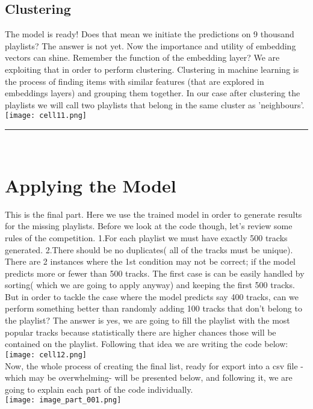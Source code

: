\documentclass[]{article}
\begin{document}
\begin{description}
\subsection{Clustering}
The model is ready! Does that mean we initiate the predictions on 9 thousand playlists? The answer is not yet. Now the importance and utility of embedding vectors can shine. Remember the function of the embedding layer? We are exploiting that in order to perform clustering. Clustering in machine learning is the process of finding items with similar features (that are explored in embeddings layers) and grouping them together. In our case after clustering the playlists we will call two playlists that belong in the same cluster as 'neighbours'. 
\\
\texttt{[image: cell11.png]}
\noindent
{\color{blue} \rule{\linewidth}{0.4mm}}
\\

\section{Applying the Model}
This is the final part. Here we use the trained model in order to generate results for the missing playlists. Before we look at the code though, let's review some rules of the competition. 1.For each playlist we must have exactly 500 tracks generated. 2.There should be no duplicates( all of the tracks must be unique). There are 2 instances where the 1st condition may not be correct; if the model predicts more or fewer than 500 tracks. The first case is can be easily handled by sorting( which we are going to apply anyway) and keeping the first 500 tracks. But in order to tackle the case where the model predicts say 400 tracks, can we perform something better than randomly adding 100 tracks that don't belong to the playlist? The answer is yes, we are going to fill the playlist with the most popular tracks because statistically there are higher chances those will be contained on the playlist. Following that idea we are writing the code below:
\\
\texttt{[image: cell12.png]}
\noindent
\\

Now, the whole process of creating the final list, ready for export into a csv file -which may be overwhelming- will be presented
below, and following it, we are going to explain each part of the code individually.
\\
\texttt{[image: image\_part\_001.png]}


\end{description}
\end{document}
